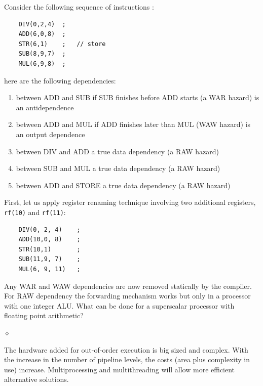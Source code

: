 \begin{exemplu}\label{warwaw}
Consider the following sequence of instructions \cite[p.~185]{Patterson05}:
\begin{verbatim}
    DIV(0,2,4)  ;
    ADD(6,0,8)  ;
    STR(6,1)    ;   // store
    SUB(8,9,7)  ;
    MUL(6,9,8)  ;
\end{verbatim}
here are the following dependencies:
\begin{enumerate}
    \item between ADD and SUB if SUB finishes before ADD starts (a WAR hazard) is an antidependence
    \item between ADD and MUL if ADD finishes later than MUL (WAW hazard) is an output dependence
    \item between DIV and ADD a true data dependency (a RAW hazard)
    \item between SUB and MUL a true data dependency (a RAW hazard)
    \item between ADD and STORE a true data dependency (a RAW hazard)
\end{enumerate}
First, let us apply register renaming technique involving two additional registers, {\tt rf(10)} and {\tt rf(11)}:
\begin{verbatim}
    DIV(0, 2, 4)    ;
    ADD(10,0, 8)    ;
    STR(10,1)       ;
    SUB(11,9, 7)    ;
    MUL(6, 9, 11)   ;
\end{verbatim}
Any WAR and WAW dependencies are now removed statically by the compiler. For RAW dependency the forwarding mechanism works but only in a processor with one integer ALU. What can be done for a superscalar processor with floating point arithmetic?

$\diamond$
\end{exemplu}

The hardware added for out-of-order execution is big sized and complex. With the increase in the number of pipeline levels, the costs (area plus complexity in use) increase. Multiprocessing and multithreading will allow more efficient alternative solutions.

